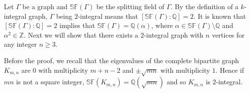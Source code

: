 \documentclass[12pt,a4paper]{article}
\def \geq {\geqslant}
\begin{document}
	
	Let $\Gamma$ be a graph and $\mathbb{SF}(\Gamma)$ be the splitting field of $\Gamma$. 
	By the definition of a $k$-integral graph, $\Gamma$ being $2$-integral means that $[\mathbb{SF}(\Gamma):\mathbb{Q}]=2$. 
	It is known that $[\mathbb{SF}(\Gamma):\mathbb{Q}]=2$ implies that $\mathbb{SF}(\Gamma)=\mathbb{Q}(\alpha)$, where $\alpha\in\mathbb{SF}(\Gamma)\setminus \mathbb{Q}$ and $\alpha^2\in\mathbb Z$. 
	Next we will show that there exists a $2$-integral graph with $n$ vertices for any integer $n\geq 3$.
	
	Before the proof, we recall that the eigenvalues of the complete bipartite graph $K_{m,n}$ are $0$ with multiplicity $m+n-2$ and $\pm\sqrt{mn}$ with multiplicity $1$. 
	Hence if $mn$ is not a square integer, $\mathbb{SF}(K_{m,n})=\mathbb{Q}(\sqrt{mn})$ and so $K_{m,n}$ is $2$-integral. 
	
\end{document}
